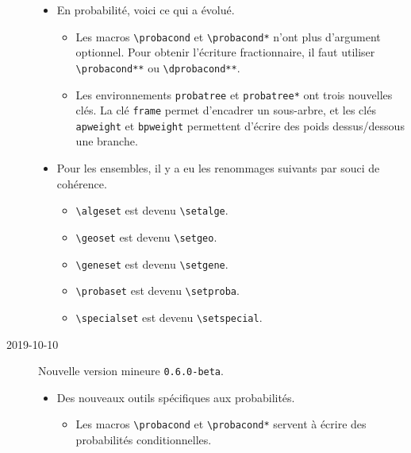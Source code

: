 \documentclass[12pt,a4paper]{article}
\begin{document}
\begin{description}
\begin{itemize}[itemsep=.5em]
    
        \item En probabilité, voici ce qui a évolué.
        \begin{itemize}[itemsep=.5em]
            \item Les macros \verb+\probacond+ et \verb+\probacond*+ n'ont plus d'argument optionnel. Pour obtenir l'écriture fractionnaire, il faut utiliser \verb+\probacond**+ ou \verb+\dprobacond**+.
    
            \item Les environnements \verb+probatree+ et \verb+probatree*+ ont trois nouvelles clés.
                      La clé \verb+frame+ permet d'encadrer un sous-arbre, et les clés \verb+apweight+ et \verb+bpweight+ permettent d'écrire des poids dessus/dessous une branche.
        \end{itemize}
    
    
        \item Pour les ensembles, il y a eu les renommages suivants par souci de cohérence.
        \begin{itemize}[itemsep=.5em]
            \item \verb+\algeset+ est devenu \verb+\setalge+.
    
            \item \verb+\geoset+ est devenu \verb+\setgeo+.
    
            \item \verb+\geneset+ est devenu \verb+\setgene+.
    
            \item \verb+\probaset+ est devenu \verb+\setproba+.
    
            \item \verb+\specialset+ est devenu \verb+\setspecial+.
        \end{itemize}
    \end{itemize}


    \medskip
    \item[2019-10-10] Nouvelle version mineure \verb+0.6.0-beta+.
    
    \begin{itemize}[itemsep=.5em]
        \item Des nouveaux outils spécifiques aux probabilités.
        \begin{itemize}[itemsep=.5em]
            \item Les macros \verb+\probacond+ et \verb+\probacond*+ servent à écrire des probabilités conditionnelles.
    

\end{itemize}
\end{itemize}
\end{description}
\end{document}

